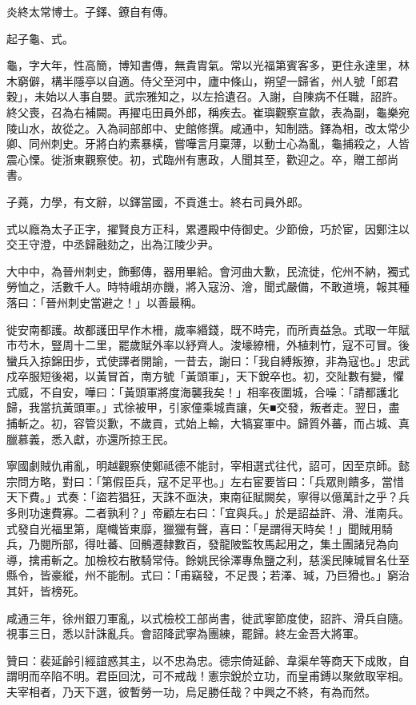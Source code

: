 \begin{pinyinscope}
 炎終太常博士。子鐸、鐐自有傳。



 起子龜、式。



 龜，字大年，性高簡，博知書傳，無貴胄氣。常以光福第賓客多，更住永達里，林木窮僻，構半隱亭以自適。侍父至河中，廬中條山，朔望一歸省，州人號「郎君穀」，未始以人事自嬰。武宗雅知之，以左拾遺召。入謝，自陳病不任職，詔許。終父喪，召為右補闕。再擢屯田員外郎，稱疾去。崔璵觀察宣歙，表為副，龜樂宛陵山水，故從之。入為祠部郎中、史館修撰。咸通中，知制誥。鐸為相，改太常少卿、同州刺史。牙將白約素暴橫，嘗嘩言月稟薄，以動士心為亂，龜捕殺之，人皆震心慄。徙浙東觀察使。初，式臨州有惠政，人聞其至，歡迎之。卒，贈工部尚書。



 子蕘，力學，有文辭，以鐸當國，不貢進士。終右司員外郎。



 式以廕為太子正字，擢賢良方正科，累遷殿中侍御史。少節儉，巧於宦，因鄭注以交王守澄，中丞歸融劾之，出為江陵少尹。



 大中中，為晉州刺史，飾郵傳，器用畢給。會河曲大歉，民流徙，佗州不納，獨式勞恤之，活數千人。時特峨胡亦饑，將入寇汾、澮，聞式嚴備，不敢道境，報其種落曰：「晉州刺史當避之！」以善最稱。



 徙安南都護。故都護田早作木柵，歲率緡錢，既不時完，而所責益急。式取一年賦市芍木，豎周十二里，罷歲賦外率以紓齊人。浚壕繚柵，外植刺竹，寇不可冒。後蠻兵入掠錦田步，式使譯者開諭，一昔去，謝曰：「我自縛叛獠，非為寇也。」忠武戍卒服短後褐，以黃冒首，南方號「黃頭軍」，天下銳卒也。初，交阯數有變，懼式威，不自安，嘩曰：「黃頭軍將度海襲我矣！」相率夜圍城，合噪：「請都護北歸，我當抗黃頭軍。」式徐被甲，引家僮乘城責讓，矢■交發，叛者走。翌日，盡捕斬之。初，容管災歉，不歲貢，式始上輸，大犒宴軍中。歸質外蕃，而占城、真臘慕義，悉入獻，亦還所掠王民。



 寧國劇賊仇甫亂，明越觀察使鄭祗德不能討，宰相選式往代，詔可，因至京師。懿宗問方略，對曰：「第假臣兵，寇不足平也。」左右宦要皆曰：「兵眾則饋多，當惜天下費。」式奏：「盜若猖狂，天誅不亟決，東南征賦闕矣，寧得以億萬計之乎？兵多則功速費寡。二者孰利？」帝顧左右曰：「宜與兵。」於是詔益許、滑、淮南兵。式發自光福里第，麾幟皆東靡，獵獵有聲，喜曰：「是謂得天時矣！」聞賊用騎兵，乃閱所部，得吐蕃、回鶻遷隸數百，發龍陂監牧馬起用之，集土團諸兒為向導，擒甫斬之。加檢校右散騎常侍。餘姚民徐澤專魚鹽之利，慈溪民陳瑊冒名仕至縣令，皆豪縱，州不能制。式曰：「甫竊發，不足畏；若澤、瑊，乃巨猾也。」窮治其奸，皆榜死。



 咸通三年，徐州銀刀軍亂，以式檢校工部尚書，徙武寧節度使，詔許、滑兵自隨。視事三日，悉以計誅亂兵。會詔降武寧為團練，罷歸。終左金吾大將軍。



 贊曰：裴延齡引經誼惑其主，以不忠為忠。德宗倚延齡、韋渠牟等商天下成敗，自謂明而卒陷不明。君臣回沈，可不戒哉！憲宗銳於立功，而皇甫鎛以聚斂取宰相。夫宰相者，乃天下選，彼暫勞一功，烏足勝任哉？中興之不終，有為而然。



\end{pinyinscope}